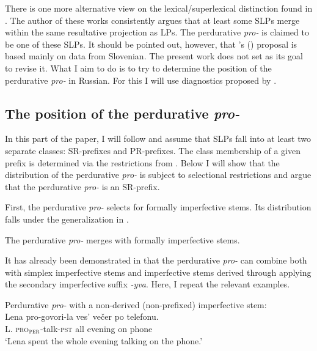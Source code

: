 \documentclass[output=paper,
]{langscibook}
\begin{document}
There is one more alternative view on the lexical/superlexical distinction found in  \citet{Žaucer2009vp,Žaucer2012syntax}. The author of these works consistently argues that at least some SLPs merge within the same resultative projection as LPs. The perdurative \textit{pro-} is claimed to be one of these SLPs. It should be pointed out, however, that \citeauthor{Žaucer2009vp}'s (\citeyear{Žaucer2009vp,Žaucer2012syntax}) proposal is based mainly on data from Slovenian. The present work does not set as its goal to revise it. What I aim to do is to try to determine the position of the perdurative \textit{pro-} in Russian. For this I will use diagnostics proposed by \citet{tatevosov2009mnozestvennaja, tatevosov2013mnozestvennaja}.

\subsection{The position of the perdurative \textit{pro-}} \label{2.2}
In this part of the paper, I will follow \cite{tatevosov2009mnozestvennaja,tatevosov2013mnozestvennaja} and assume that SLPs fall into at least two separate classes: SR-prefixes and PR-prefixes. 
The class membership of a given prefix is determined via the restrictions from . Below I will show that the distribution of the perdurative \textit{pro-} is subject to selectional restrictions and argue that the perdurative \textit{pro-} is an SR-prefix.

First, the perdurative \textit{pro-} selects for formally imperfective stems. Its distribution falls under the generalization in . 

\ea \label{ex:naumov:7}
The perdurative \textit{pro-} merges with formally imperfective stems.
\z

\noindent It has already been demonstrated in  that the perdurative \textit{pro-} can combine both with simplex imperfective stems and imperfective stems derived through applying the secondary imperfective suffix \textit{-yva}. Here, I repeat the relevant examples.

    \ea Perdurative \textit{pro-} with a non-derived (non-prefixed) imperfective stem:\label{ex:naumov:8}\smallskip\\
    \gll Lena	pro-govori-la		ves’	večer		po	telefonu. \\
L. \textsc{pro}$_\textsc{per}$-talk-\textsc{pst}	all	evening	on	phone\\
\glt `Lena spent the whole evening talking on the phone.'
\z
\end{document}
